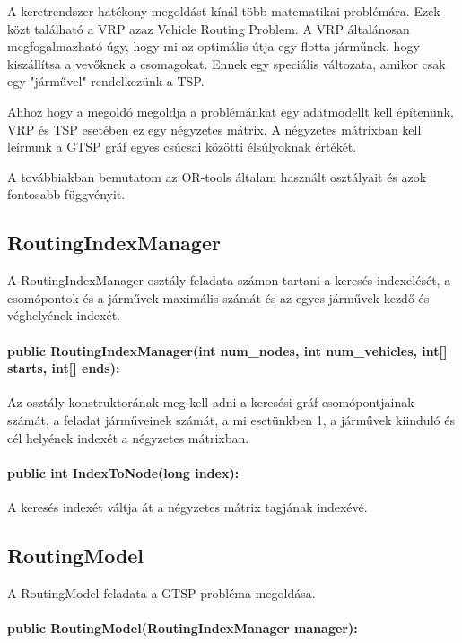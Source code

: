 A keretrendszer hatékony megoldást kínál több matematikai problémára. Ezek közt található a VRP azaz Vehicle Routing Problem. A VRP általánosan megfogalmazható úgy, hogy mi az optimális útja egy flotta járműnek, hogy kiszállítsa a vevőknek a csomagokat. Ennek egy speciális változata, amikor csak egy  "járművel" rendelkezünk a TSP.

Ahhoz hogy a megoldó megoldja a problémánkat egy adatmodellt kell építenünk, VRP és TSP esetében ez egy négyzetes mátrix. A négyzetes mátrixban kell leírnunk a GTSP gráf egyes csúcsai közötti élsúlyoknak  értékét.

A továbbiakban bemutatom az OR-tools általam használt osztályait és azok fontosabb függvényit.

\subsection{RoutingIndexManager}

A RoutingIndexManager osztály feladata számon tartani a keresés indexelését, a csomópontok és a járművek maximális számát és az egyes járművek kezdő és véghelyének indexét.

\paragraph{public RoutingIndexManager(int num\_nodes, int num\_vehicles, int[] starts, int[] ends):} 

Az osztály konstruktorának meg kell adni a keresési gráf csomópontjainak számát, a feladat járműveinek számát, a mi esetünkben 1, a járművek kiinduló és cél helyének indexét a négyzetes mátrixban.

\paragraph{public int IndexToNode(long index):}

A keresés indexét váltja át a négyzetes mátrix tagjának indexévé.

\subsection{RoutingModel}

A RoutingModel feladata a GTSP probléma megoldása. 

\paragraph{public RoutingModel(RoutingIndexManager manager):}

